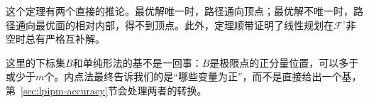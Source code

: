 这个定理有两个直接的推论。最优解唯一时，路径通向顶点；最优解不唯一时，路径通向最优面的相对内部，得不到顶点。此外，定理顺带证明了线性规划在$\mathcal{F}^{\circ}$非空时总有严格互补解。

这里的下标集$B$和单纯形法的基不是一回事：$B$是极限点的正分量位置，可以多于或少于$m$个。内点法最终告诉我们的是“哪些变量为正”，而不是直接给出一个基，第~\ref{sec:lpipm-accuracy}节会处理两者的转换。
